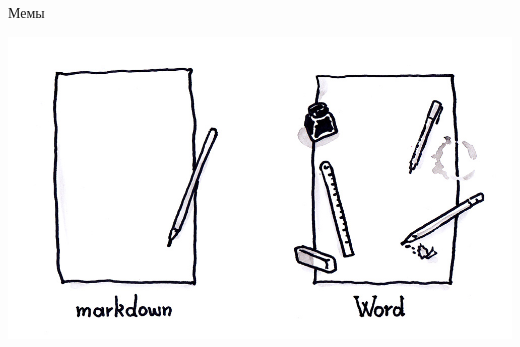 \documentclass[newPxFont]{beamer}
\begin{document}
 
\begin{frame}{Мемы}
\begin{center}
\includegraphics[width=0.6\linewidth]{mdwd.jpg}
\end{center}
\end{frame}


\begin{frame}[fragile]
\end{frame}
\end{document}
